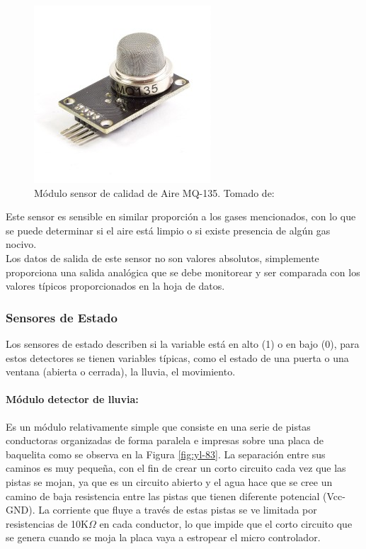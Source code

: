 \begin{figure}[H]
	\centering
	\caption{Módulo sensor de calidad de Aire MQ-135. Tomado de: \cite{MQ1}}
	\label{fig:sensor-calidad-aire-mq135}
 	\includegraphics[width=0.35\linewidth]{Imagenes/sensor-calidad-aire-mq135}
\end{figure}

Este sensor es sensible en similar proporción a los gases mencionados, con lo que se puede determinar si el aire está limpio o si existe presencia de algún gas nocivo.\\

Los datos de salida de este sensor no son valores absolutos, simplemente proporciona una salida analógica que se debe monitorear y ser comparada con los valores típicos proporcionados en la hoja de datos.\cite{MQ2}

\subsubsection{Sensores de Estado}

Los sensores de estado describen si la variable está en alto (1) o en bajo (0), para estos detectores se tienen variables típicas, como el estado de una puerta o una ventana (abierta o cerrada), la lluvia, el movimiento.

\paragraph{Módulo detector de lluvia: }

Es un módulo relativamente simple que consiste en una serie de pistas conductoras organizadas de forma paralela e impresas sobre una placa de baquelita como se observa en la Figura \ref{fig:yl-83}. La separación entre sus caminos es muy pequeña, con el fin de crear un corto circuito cada vez que las pistas se mojan, ya que es un circuito abierto y el agua hace que se cree un camino de baja resistencia entre las pistas que tienen diferente potencial (Vcc-GND). La corriente que fluye a través de estas pistas se ve limitada por resistencias de 10K$\Omega$ en cada conductor, lo que impide que el corto circuito que se genera cuando se moja la placa vaya a estropear el micro controlador.\cite{LLU}

